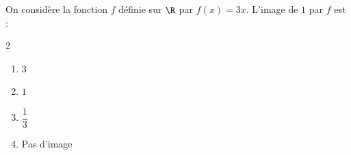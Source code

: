 \begin{exo}{}
	On considère la fonction $f$ définie sur $\R$ par $f(x) = 3x$. L'image de $1$ par $f$ est :
	\vspace*{-2mm}\begin{multicols}{2}
	\begin{enumerate}
		\item $3$
		\item $1$
		\item $\dfrac{1}{3}$
		\item Pas d'image
	\end{enumerate}
	\end{multicols}
\end{exo}
